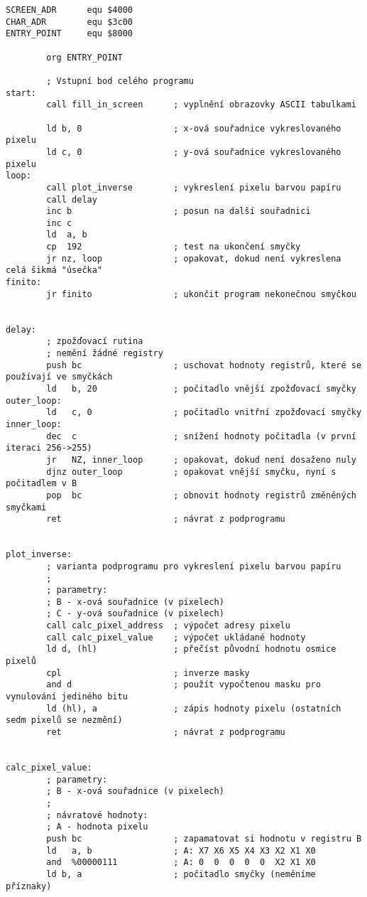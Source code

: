 \documentclass{article}
\begin{document}
\begin{verbatim}
SCREEN_ADR      equ $4000
CHAR_ADR        equ $3c00
ENTRY_POINT     equ $8000
 
        org ENTRY_POINT
 
        ; Vstupní bod celého programu
start:
        call fill_in_screen      ; vyplnění obrazovky ASCII tabulkami
 
        ld b, 0                  ; x-ová souřadnice vykreslovaného pixelu
        ld c, 0                  ; y-ová souřadnice vykreslovaného pixelu
loop:
        call plot_inverse        ; vykreslení pixelu barvou papíru
        call delay
        inc b                    ; posun na další souřadnici
        inc c
        ld  a, b
        cp  192                  ; test na ukončení smyčky
        jr nz, loop              ; opakovat, dokud není vykreslena celá šikmá "úsečka"
finito:
        jr finito                ; ukončit program nekonečnou smyčkou
 
 
delay:
        ; zpožďovací rutina
        ; nemění žádné registry
        push bc                  ; uschovat hodnoty registrů, které se používají ve smyčkách
        ld   b, 20               ; počitadlo vnější zpožďovací smyčky
outer_loop:
        ld   c, 0                ; počitadlo vnitřní zpožďovací smyčky
inner_loop:
        dec  c                   ; snížení hodnoty počitadla (v první iteraci 256->255)
        jr   NZ, inner_loop      ; opakovat, dokud není dosaženo nuly
        djnz outer_loop          ; opakovat vnější smyčku, nyní s počitadlem v B
        pop  bc                  ; obnovit hodnoty registrů změněných smyčkami
        ret                      ; návrat z podprogramu
 
 
plot_inverse:
        ; varianta podprogramu pro vykreslení pixelu barvou papíru
        ;
        ; parametry:
        ; B - x-ová souřadnice (v pixelech)
        ; C - y-ová souřadnice (v pixelech)
        call calc_pixel_address  ; výpočet adresy pixelu
        call calc_pixel_value    ; výpočet ukládané hodnoty
        ld d, (hl)               ; přečíst původní hodnotu osmice pixelů
        cpl                      ; inverze masky
        and d                    ; použít vypočtenou masku pro vynulování jediného bitu
        ld (hl), a               ; zápis hodnoty pixelu (ostatních sedm pixelů se nezmění)
        ret                      ; návrat z podprogramu
 
 
calc_pixel_value:
        ; parametry:
        ; B - x-ová souřadnice (v pixelech)
        ;
        ; návratové hodnoty:
        ; A - hodnota pixelu
        push bc                  ; zapamatovat si hodnotu v registru B
        ld   a, b                ; A: X7 X6 X5 X4 X3 X2 X1 X0 
        and  %00000111           ; A: 0  0  0  0  0  X2 X1 X0
        ld b, a                  ; počitadlo smyčky (neměníme příznaky)

\end{verbatim}
\end{document}
